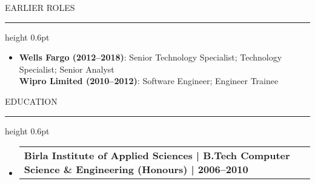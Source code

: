 \documentclass[letterpaper,10pt]{article}
\makeatletter
\newcommand{\subheadingtitlevspace}{\vspace{-3pt}}
\newcommand{\titleItem}[1]{\textbf{#1}}
\newcommand{\resumeProjectHeading}[2]{\item\begin{tabular*}{0.97\textwidth}{l@{\extracolsep{\fill}}r}#1 & \textit{ #2} \\\end{tabular*}\vspace{-6pt}}
\newcommand{\resumeSubHeadingListStart}{\subheadingtitlevspace\begin{itemize}[leftmargin=0.15in, label={}]}
\newcommand{\resumeSubHeadingListEnd}{\end{itemize}}
\newcommand{\ResumeSection}[1]{\par{\fontsize{11pt}{13pt}\selectfont \MakeUppercase{#1}}\vspace{1pt}\hrule height 0.6pt}
\makeatother
\begin{document}
\ResumeSection{Earlier Roles}\vspace{-2pt}
\begin{itemize}[leftmargin=0.15in, label={}]
\item{\titleItem{Wells Fargo (2012--2018)}{: Senior Technology Specialist; Technology Specialist; Senior Analyst} \\[-2pt]
        \titleItem{Wipro Limited (2010--2012)}{: Software Engineer; Engineer Trainee}}
\end{itemize}

\ResumeSection{Education}\vspace{-2pt}
\resumeSubHeadingListStart
\resumeProjectHeading{\titleItem{Birla Institute of Applied Sciences | B.Tech Computer Science \& Engineering (Honours) | 2006--2010}}{}
\resumeSubHeadingListEnd
\end{document}

